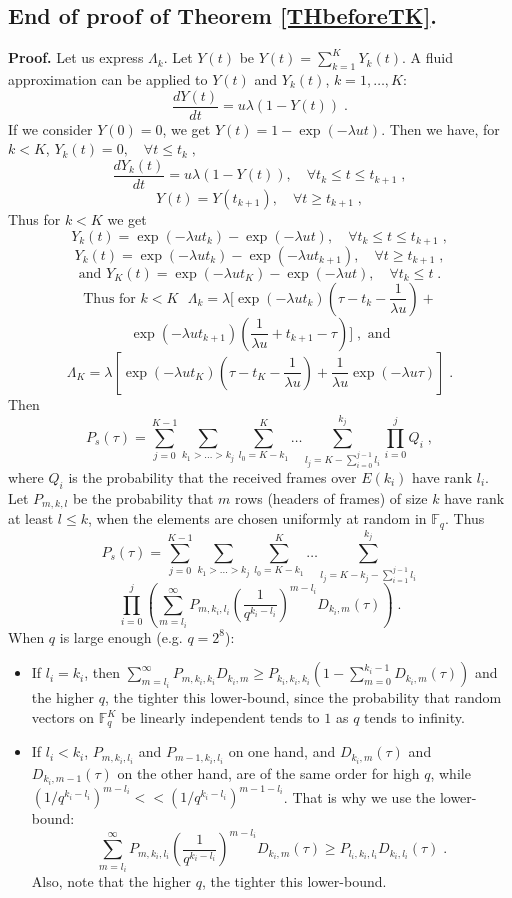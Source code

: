 \documentclass[10pt,twocolumn,conference,final]{IEEEtran}
\begin{document}
\subsection{\bf End of proof of Theorem \ref{THbeforeTK}.}
{\bf Proof.} Let us express $\Lambda_k$. Let $Y(t)$ be $Y(t)=\sum_{k=1}^K Y_k(t)$. A fluid 
approximation can be applied to $Y(t)$ and $Y_k(t)$, $k=1,\dots,K$:
\[\frac{d Y(t)}{dt}=u\lambda(1-Y(t))\;.\]
If we consider $Y(0)=0$, we get $Y(t)=1-\exp(-\lambda u t)$. Then we have, for $k<K$, 
\(Y_k(t)=0,\quad \forall t\leq t_k\;,\)
\[\frac{d Y_k(t)}{dt}=u\lambda (1-Y(t)),\quad \forall t_k\leq t\leq t_{k+1}\;,\]
\[
Y(t)=Y(t_{k+1}), \quad\forall t\geq t_{k+1}\;,
\]
Thus for $k<K$ we get
\[
Y_k(t)=\exp(-\lambda u t_k)-\exp(-\lambda u t),\quad \forall t_k\leq t\leq t_{k+1}\;,
\]
\[
Y_k(t)=\exp(-\lambda u t_k)-\exp(-\lambda u t_{k+1}),\quad\forall t\geq t_{k+1}\;,
\]
\[
\mbox{and }
Y_K(t)=\exp(-\lambda u t_K)-\exp(-\lambda u t),\quad \forall t_k\leq t\;.\]
\[
\mbox{Thus for $k<K$ }
\Lambda_k=\lambda[\exp(-\lambda u t_k)\left(\tau-t_k-\frac{1}{\lambda u}\right)+\]
\[\exp(-\lambda u t_{k+1})\left(\frac{1}{\lambda u}+t_{k+1}-\tau\right)]\;,
\mbox{ and}
\]
\[\Lambda_K=\lambda\left[\exp(-\lambda u t_K)\left(\tau-t_K-\frac{1}{\lambda u}\right)+\frac{1}{\lambda u}\exp(-\lambda u \tau)\right]\;.\]
Then
\[P_s(\tau)=\sum_{j=0}^{K-1}\sum_{k_1>\dots>k_j}\sum_{l_0=K-k_1}^{K}\dots\sum_{l_{j}=K-\sum_{i=0}^{j-1} l_i}^{k_j} \prod_{i=0}^j Q_i\;,\]
where $Q_i$ is the probability that the received frames over $E(k_i)$ have rank $l_i$. Let $P_{m,k,l}$ be the 
probability that $m$ rows (headers of frames) of size $k$ have rank at least $l\leq k$, when the elements are 
chosen uniformly at random in $\mathbb{F}_q$. Thus
\[P_s(\tau)=\sum_{j=0}^{K-1}\sum_{k_1>\dots>k_j}\sum_{l_0=K-k_1}^{K}\dots\sum_{l_{j}=K-k_{j}-\sum_{i=1}^{j-1} l_i}^{k_j}\]
\[\prod_{i=0}^j \left(\sum_{m=l_{i}}^{\infty}P_{m,k_i,l_i}\left(\frac{1}{q^{k_i-l_i}}\right)^{m-l_i}D_{k_i,m}(\tau)\right)\;.\]
When $q$ is large enough (e.g. $q=2^8$):
\begin{itemize}
\item If $l_i=k_i$, then $\sum_{m=l_{i}}^{\infty}P_{m,k_i,k_i}D_{k_i,m}\geq P_{k_i,k_i,k_i}\left(1-\sum_{m=0}^{k_i-1}D_{k_i,m}(\tau)\right)$ 
and the higher $q$, the tighter this lower-bound, since the probability that random vectors on $\mathbb{F}_q^K$ be 
linearly independent tends to $1$ as $q$ tends to infinity.
\item If $l_i<k_i$, $P_{m,k_i,l_i}$ and $P_{m-1,k_i,l_i}$ on one hand, and $D_{k_i,m}(\tau)$ and $D_{k_i,m-1}(\tau)$ on the other 
hand, are of the same order for high $q$, while $\left({1}/{q^{k_i-l_i}}\right)^{m-l_i}<< \left({1}/{q^{k_i-l_i}}\right)^{m-1-l_i}$. 
That is why we use the lower-bound:
\[\sum_{m=l_{i}}^{\infty}P_{m,k_i,l_i}\left(\frac{1}{q^{k_i-l_i}}\right)^{m-l_i}D_{k_i,m}(\tau)\geq P_{l_i,k_i,l_i}D_{k_i,l_i}(\tau)\;.\]
Also, note that the higher $q$, the tighter this lower-bound.
\end{itemize}
\end{document}
